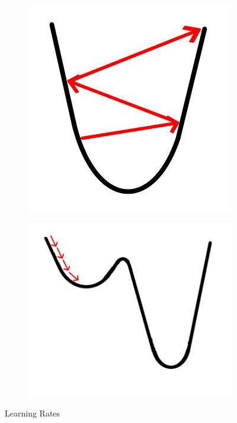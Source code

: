 \begin{figure}[h]
    \centering
    \begin{subfigure}[b]{0.4\textwidth}
        \includegraphics[width=\textwidth]{figures/dl/high_lr.jpeg}
        \label{fig:high_lr}
    \end{subfigure}
    \begin{subfigure}[b]{0.49\textwidth}
        \includegraphics[width=\textwidth]{figures/dl/low_lr.jpeg}
        \label{fig:low_rl}
    \end{subfigure}
    \caption{Learning Rates}\label{fig:learning_rates}
\end{figure}

